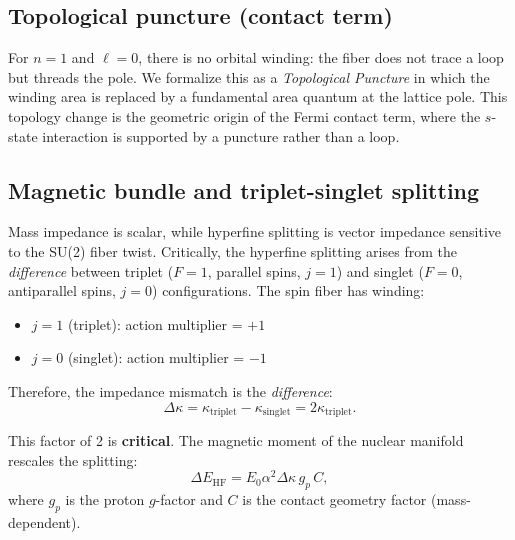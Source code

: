 \documentclass[aps,prl,twocolumn,showpacs,superscriptaddress,groupedaddress]{revtex4-2}
\begin{document}
\subsection{Topological puncture (contact term)}

For $n=1$ and $\ell=0$, there is no orbital winding: the fiber does not trace a loop but
threads the pole. We formalize this as a \emph{Topological Puncture} in which the winding
area is replaced by a fundamental area quantum at the lattice pole. This topology change
is the geometric origin of the Fermi contact term, where the $s$-state interaction is
supported by a puncture rather than a loop.

\subsection{Magnetic bundle and triplet-singlet splitting}

Mass impedance is scalar, while hyperfine splitting is vector impedance sensitive to the
SU(2) fiber twist. Critically, the hyperfine splitting arises from the \textit{difference} between triplet ($F=1$, parallel spins, $j=1$) and singlet ($F=0$, antiparallel spins, $j=0$) configurations. The spin fiber has winding:
\begin{itemize}
\item $j=1$ (triplet): action multiplier = $+1$
\item $j=0$ (singlet): action multiplier = $-1$
\end{itemize}

Therefore, the impedance mismatch is the \textit{difference}:
\begin{equation}
\Delta\kappa = \kappa_{\text{triplet}} - \kappa_{\text{singlet}} = 2\kappa_{\text{triplet}}.
\end{equation}

This factor of 2 is \textbf{critical}. The magnetic moment of the nuclear manifold rescales the splitting:
\begin{equation}
\Delta E_{\mathrm{HF}} = E_0 \alpha^2 \Delta\kappa\, g_p\, C,
\end{equation}
where $g_p$ is the proton $g$-factor and $C$ is the contact geometry factor (mass-dependent).
\end{document}
